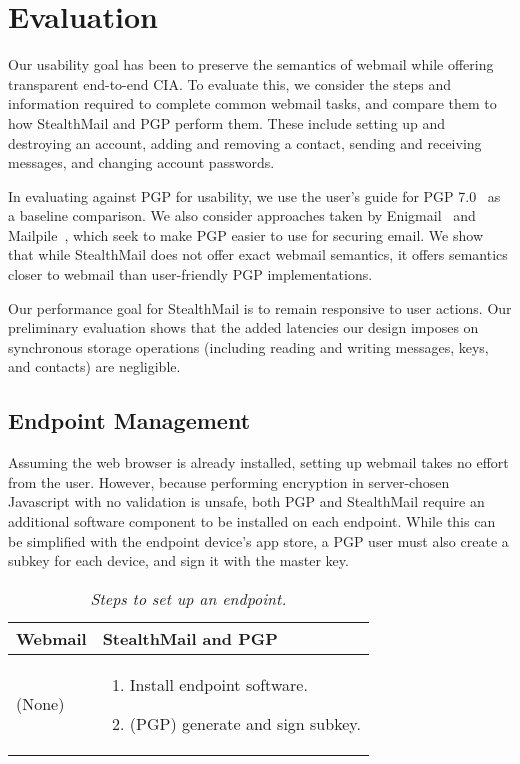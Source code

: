 \section{Evaluation}
\label{sec:evaluation}

Our usability goal has been to preserve the semantics of webmail while offering transparent end-to-end CIA.  To evaluate this, we consider the steps and information required to complete common webmail tasks, and compare them to how StealthMail and PGP perform them.  These include setting up and destroying an account, adding and removing a contact, sending and receiving messages, and changing account passwords.

In evaluating against PGP for usability, we use the user’s guide for PGP 7.0~\cite{pgp7} as a baseline comparison.  We also consider approaches taken by Enigmail~\cite{enigmail} and Mailpile~\cite{mailpile}, which seek to make PGP easier to use for securing email.  We show that while StealthMail does not offer exact webmail semantics, it offers semantics closer to webmail than user-friendly PGP implementations.

Our performance goal for StealthMail is to remain responsive to user actions.  Our preliminary evaluation shows that the added latencies our design imposes on synchronous storage operations (including reading and writing messages, keys, and contacts) are negligible.

\subsection{Endpoint Management}
Assuming the web browser is already installed, setting up webmail takes no effort from the user.  However, because performing encryption in server-chosen Javascript with no validation is unsafe, both PGP and StealthMail require an additional software component to be installed on each endpoint.  While this can be simplified with the endpoint device's app store, a PGP user must also create a subkey for each device, and sign it with the master key.

\begin{table}[ht!]
\begin{tabular}{ | L{2.0cm} | L{4.5cm} |}
\hline
\textbf{Webmail} & \textbf{StealthMail and PGP} \\
\hline
(None) &

\vspace{-3mm} 
\begin{enumerate}
  \item{Install endpoint software.}
  \item{(PGP) generate and sign subkey.}
\end{enumerate} \\

\hline
\end{tabular}
\caption{\it Steps to set up an endpoint.}
\label{tab:account-creation}
\end{table}

